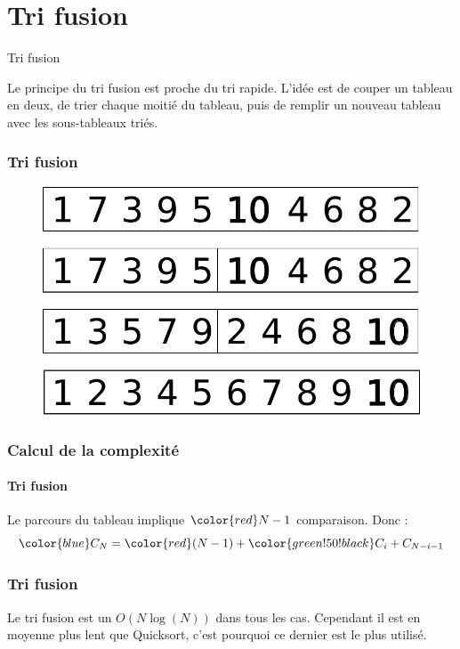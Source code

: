 \section{Tri fusion}

\begin{frame}{Tri fusion}

Le principe du tri fusion est proche du tri rapide. L'idée est de couper un tableau en deux, de trier chaque moitié du tableau, puis de remplir un nouveau tableau avec les sous-tableaux triés.

\end{frame}

\begin{frame}
 \frametitle{Tri fusion}

\begin{figure}
\centering
\includegraphics[width = 0.7\linewidth]{./images/fusion.pdf}
\end{figure}
\end{frame}

\begin{frame}
\frametitle{Calcul de la complexité}
\framesubtitle{Tri fusion}

Le parcours du tableau implique $\color{red} N-1$ comparaison. Donc :
$$ {\color{blue} C_N} = {\color{red} (N-1)} + {\color{green!50!black} C_i + C_{N-i-1}}$$
\end{frame}

\begin{frame}
 \frametitle{Tri fusion}
 Le tri fusion est un $O(N\log(N))$ dans tous les cas. Cependant il est en moyenne plus lent que Quicksort, c'est pourquoi ce dernier est le plus utilisé.
\end{frame}

